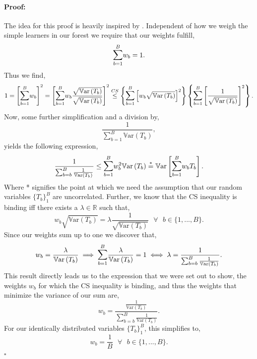 \documentclass[a4paper,12pt, headsepline]{scrartcl}
\newenvironment{proof}{\paragraph{Proof:}}{\hfill$\square$}
\numberwithin{equation}{section}
\begin{document}
 \begin{proof}
 	The idea for this proof is heavily inspired by \citet{shahar2017}.
 	Independent of how we weigh the simple learners in our forest we require that our weights fulfill,
 	\[
 	\mathlarger{\sum}\limits_{b = 1}^B w_b = 1.
 	\]
 	Thus we find,
 	\begin{gather*}
 		1 = \left[\mathlarger{\sum}\limits_{b = 1}^B w_b\right]^2 = \left[\mathlarger{\sum}\limits_{b = 1}^B w_b\frac{\sqrt{\mathbb{V}\text{ar}\left( T_b \right)}}{\sqrt{\mathbb{V}\text{ar}\left( T_b \right)}}\right]^2 \overset{CS}{\leq} \left\{ \mathlarger{\sum}\limits_{b = 1}^B \left[w_b \sqrt{\mathbb{V}\text{ar}\left( T_b \right)} \right]^2 \right\} \left\{ \mathlarger{\sum}\limits_{b = 1}^B \left[ \frac{1}{\sqrt{\mathbb{V}\text{ar}\left( T_b \right)}} \right]^2 \right\}.
 	\end{gather*}
 	Now, some further simplification and a division by,
 	\[
 	\frac{1}{\sum_{b = 1}^B \mathbb{V}\text{ar}\left( T_b \right)},
 	\]
 	yields the following expression,
 	\[
 	\frac{1}{\sum_{b = b}^B \frac{1}{\mathbb{V}\text{ar}\left( T_b \right)}} \leq
 	\mathlarger{\sum}\limits_{b = 1}^B w_b^2 \mathbb{V}\text{ar}\left( T_b \right) \overset{*}{=} 
 	\mathbb{V}\text{ar}\left[\mathlarger{\sum}\limits_{b = 1}^B w_b T_b \right].
 	\]
 	Where * signifies the point at which we need the assumption that our random variables $\{T_b\}_1^B$ are uncorrelated. Further, we know that the CS inequality is binding iff there exists a $\lambda \in \mathbb{R}$ such that,
 	\[
 	w_b \sqrt{\mathbb{V}\text{ar}\left( T_b \right)} = \lambda \frac{1}{\sqrt{\mathbb{V}\text{ar}\left( T_b \right)}} \text{ } \forall \text{ } b\in \{1, ..., B\}.
 	\]
 	Since our weights sum up to one we discover that,
 	\[
 	w_b = \frac{\lambda}{\mathbb{V}\text{ar}\left( T_b \right)} \implies 
 	\mathlarger{\sum}\limits_{b = 1}^B \frac{\lambda}{\mathbb{V}\text{ar}\left( T_b \right)} = 1 \iff
 	\lambda = \frac{1}{\sum_{b = b}^B\frac{1}{\mathbb{V}\text{ar}\left( T_b \right)}}.
 	\]
 	This result directly leads us to the expression that we were set out to show, the weights $w_b$ for which the CS inequality is binding, and thus the weights that minimize the variance of our sum are,
 	\[
 	w_b = \frac{\frac{1}{\mathbb{V}\text{ar}\left( T_b \right)}}{\sum_{b = b}^B\frac{1}{\mathbb{V}\text{ar}\left( T_b \right)}}.
 	\]
 	For our identically distributed variables  $\{T_b\}_1^B$, this simplifies to,
 	\[
 	w_b = \frac{1}{B}\text{ } \forall \text{ } b\in \{1, ..., B\}.
 	\]  
 \end{proof}
\end{document}
